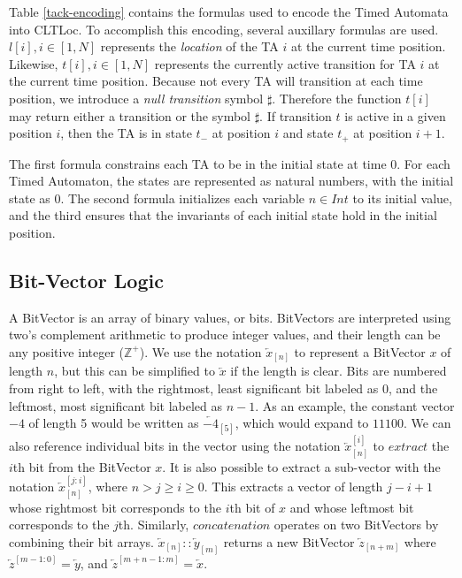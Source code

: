 \documentclass[a4paper,12pt]{article}
\begin{document}
Table \ref{tack-encoding} contains the formulas used to encode the Timed Automata into
CLTLoc. To accomplish this encoding, several auxillary formulas are used.
\(l[i], i \in [1,N]\) represents the \emph{location} of the TA \(i\) at the
current time position. Likewise, \(t[i], i \in [1,N]\) represents the currently
active transition for TA \(i\) at the current time position. Because not every
TA will transition at each time position, we introduce a \emph{null transition}
symbol \(\sharp\). Therefore the function \(t[i]\) may return either a
transition or the symbol \(\sharp\). If transition \(t\)
is active in a given position \(i\), then the TA is in state \(t_{-}\) at
position \(i\) and state \(t_{+}\) at position \(i+1\).

The first formula constrains each TA to be in the initial state at time 0. For
each Timed Automaton, the states are represented as natural numbers, with the
initial state as \(0\). The second formula initializes each variable
\(n \in Int\) to its initial value, and the third ensures that the invariants of
each initial state hold in the initial position.

\subsection{Bit-Vector Logic}\label{bvlogic}
A BitVector is an array of binary values, or bits. BitVectors are interpreted
using two's complement arithmetic to produce integer values, and their length
can be any positive integer (\(\mathbb{Z}^+\)). We use the notation
\(\overleftarrow{x}_{[n]}\) to represent a BitVector \(x\) of length \(n\), but
this can be simplified to \(\overleftarrow{x}\) if the length is clear. Bits are
numbered from right to left, with the rightmost, least significant bit labeled
as 0, and the leftmost, most significant bit labeled as \(n-1\). As an example,
the constant vector \(-4\) of length 5 would be written as
\(\overleftarrow{-4}_{[5]}\), which would expand to \(11100\). We can also
reference individual bits in the vector using the notation
\(\overleftarrow{x}_{[n]}^{[i]}\) to \(extract\) the \(i\)th bit from the
BitVector \(x\). It is also possible to extract a sub-vector with the notation
\(\overleftarrow{x}_{[n]}^{[j:i]}\), where \(n>j\geq i\geq 0\). This extracts a
vector of length \(j-i+1\) whose rightmost bit corresponds to the \(i\)th bit of
\(x\) and whose leftmost bit corresponds to the \(j\)th. Similarly,
\(concatenation\) operates on two BitVectors by combining their bit arrays.
\(\overleftarrow{x}_{[n]} :: \overleftarrow{y}_{[m]}\) returns a new BitVector
\(\overleftarrow{z}_{[n+m]}\) where \(\overleftarrow{z}^{[m-1:0]} =
\overleftarrow{y}\), and \(\overleftarrow{z}^{[m+n-1:m]} = \overleftarrow{x}\).
\end{document}
